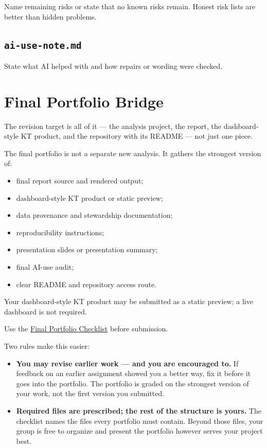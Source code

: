 \documentclass[
  letterpaper,
  DIV=11,
  numbers=noendperiod,
  oneside]{scrreprt}
\providecommand{\tightlist}{%
  \setlength{\itemsep}{0pt}\setlength{\parskip}{0pt}}
\begin{document}
Name remaining risks or state that no known risks remain. Honest risk
lists are better than hidden problems.

\subsection*{\texorpdfstring{\texttt{ai-use-note.md}}{ai-use-note.md}}\label{ai-use-note.md-5}

State what AI helped with and how repairs or wording were checked.

\section*{Final Portfolio Bridge}\label{final-portfolio-bridge}


The revision target is all of it --- the analysis project, the report,
the dashboard-style KT product, and the repository with its README ---
not just one piece.

The final portfolio is not a separate new analysis. It gathers the
strongest version of:

\begin{itemize}
\tightlist
\item
  final report source and rendered output;
\item
  dashboard-style KT product or static preview;
\item
  data provenance and stewardship documentation;
\item
  reproducibility instructions;
\item
  presentation slides or presentation summary;
\item
  final AI-use audit;
\item
  clear README and repository access route.
\end{itemize}

Your dashboard-style KT product may be submitted as a static preview; a
live dashboard is not required.

Use the
\href{../../milestones/final-portfolio/final-portfolio-checklist.md}{Final
Portfolio Checklist} before submission.

Two rules make this easier:

\begin{itemize}
\tightlist
\item
  \textbf{You may revise earlier work --- and you are encouraged to.} If
  feedback on an earlier assignment showed you a better way, fix it
  before it goes into the portfolio. The portfolio is graded on the
  strongest version of your work, not the first version you submitted.
\item
  \textbf{Required files are prescribed; the rest of the structure is
  yours.} The checklist names the files every portfolio must contain.
  Beyond those files, your group is free to organize and present the
  portfolio however serves your project best.
\end{itemize}
\end{document}
